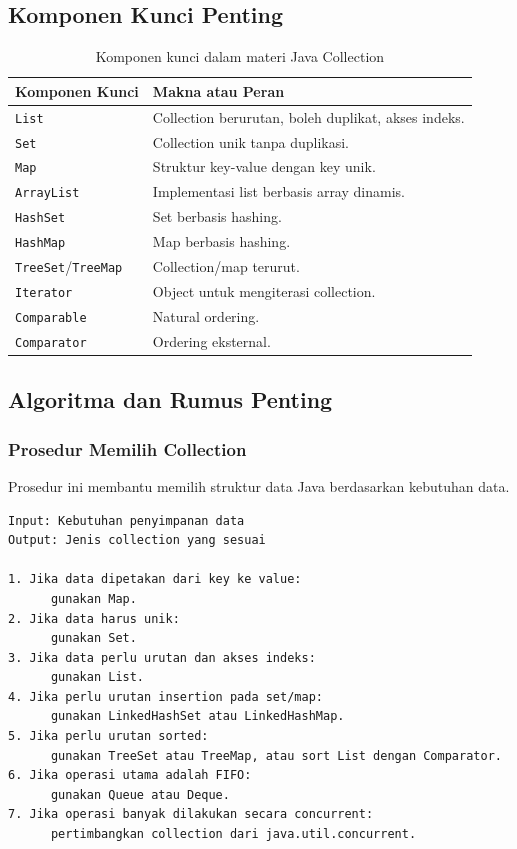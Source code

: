 \subsection{Komponen Kunci Penting}

\begin{table}[H]
\centering
\begin{tabularx}{\textwidth}{|L{0.28\textwidth}|X|}
\hline
\textbf{Komponen Kunci} & \textbf{Makna atau Peran} \\
\hline
\texttt{List} & Collection berurutan, boleh duplikat, akses indeks. \\
\hline
\texttt{Set} & Collection unik tanpa duplikasi. \\
\hline
\texttt{Map} & Struktur key-value dengan key unik. \\
\hline
\texttt{ArrayList} & Implementasi list berbasis array dinamis. \\
\hline
\texttt{HashSet} & Set berbasis hashing. \\
\hline
\texttt{HashMap} & Map berbasis hashing. \\
\hline
\texttt{TreeSet}/\texttt{TreeMap} & Collection/map terurut. \\
\hline
\texttt{Iterator} & Object untuk mengiterasi collection. \\
\hline
\texttt{Comparable} & Natural ordering. \\
\hline
\texttt{Comparator} & Ordering eksternal. \\
\hline
\end{tabularx}
\caption{Komponen kunci dalam materi Java Collection}
\label{tab:komponen-kunci-java-collection}
\end{table}

\subsection{Algoritma dan Rumus Penting}

\subsubsection{Prosedur Memilih Collection}

\begin{jawab}
Prosedur ini membantu memilih struktur data Java berdasarkan kebutuhan data.
\end{jawab}

\begin{lstlisting}[caption={Pseudocode pemilihan collection}, label={lst:collection-choice}]
Input: Kebutuhan penyimpanan data
Output: Jenis collection yang sesuai

1. Jika data dipetakan dari key ke value:
      gunakan Map.
2. Jika data harus unik:
      gunakan Set.
3. Jika data perlu urutan dan akses indeks:
      gunakan List.
4. Jika perlu urutan insertion pada set/map:
      gunakan LinkedHashSet atau LinkedHashMap.
5. Jika perlu urutan sorted:
      gunakan TreeSet atau TreeMap, atau sort List dengan Comparator.
6. Jika operasi utama adalah FIFO:
      gunakan Queue atau Deque.
7. Jika operasi banyak dilakukan secara concurrent:
      pertimbangkan collection dari java.util.concurrent.
\end{lstlisting}

